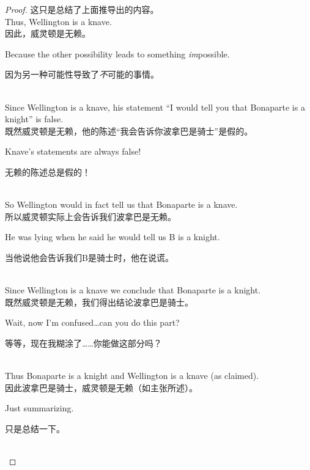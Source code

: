\begin{enumerate}
\begin{enumerate}
{\begin{proof}
{      这只是总结了上面推导出的内容。
      }\\
      Thus, Wellington is a knave.\\
      因此，威灵顿是无赖。\\
      \rule{0pt}{0pt} \hfill \parbox{3in}{\color[rgb]{1,0,0}  Because the other possibility leads to something {\em im}possible.
      
      因为另一种可能性导致了{\em 不}可能的事情。
      }\\
      Since Wellington is a knave, his statement ``I would tell you that Bonaparte is a knight'' is false. \\
      既然威灵顿是无赖，他的陈述“我会告诉你波拿巴是骑士”是假的。\\
      \rule{0pt}{0pt} \hfill \parbox{3in}{\color[rgb]{1,0,0} Knave's statements are always false!
      
      无赖的陈述总是假的！
      }\\
      So Wellington would in fact tell us that Bonaparte is a knave. \\
      所以威灵顿实际上会告诉我们波拿巴是无赖。\\
      \rule{0pt}{0pt} \hfill \parbox{3in}{\color[rgb]{1,0,0} He was lying when he said he would tell us B is a knight.
      
      当他说他会告诉我们B是骑士时，他在说谎。
      } \\
      Since Wellington is a knave we conclude that Bonaparte is a knight.\\
      既然威灵顿是无赖，我们得出结论波拿巴是骑士。\\
      \rule{0pt}{0pt} \hfill \parbox{3in}{\color[rgb]{1,0,0} Wait, now I'm confused\ldots can you do this part?
      
      等等，现在我糊涂了……你能做这部分吗？
      } \\
      Thus Bonaparte is a knight and Wellington is a knave (as claimed).\\
      因此波拿巴是骑士，威灵顿是无赖（如主张所述）。\\
      \rule{0pt}{0pt} \hfill \parbox{3in}{\color[rgb]{1,0,0} Just summarizing.
      
      只是总结一下。
      } \\
  \end{proof}
  
  }
  
  \end{enumerate}
  
  \end{enumerate}